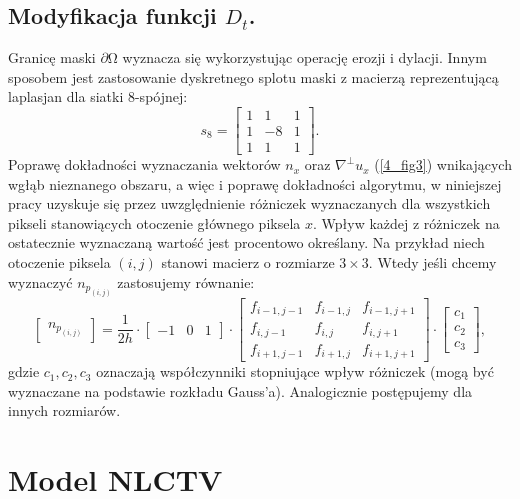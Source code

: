 \documentclass[a4paper,12pt,twoside,openany]{report}
\begin{document}
\subsection{Modyfikacja funkcji $D_t$.}
\label{ssec:modDtForCrim}
Granicę maski $\partial \mathrm{\Omega }$ wyznacza się wykorzystując operację erozji i dylacji. Innym sposobem jest zastosowanie dyskretnego splotu maski z macierzą reprezentującą laplasjan dla siatki 8-spójnej: 
\begin{equation}
s_8 = 
\left[ \begin{array}{ccc}
1 & 1 & 1 \\ 
1 & -8 & 1 \\ 
1 & 1 & 1 \end{array}
\right]
\label{LAPLASJAN}
.
\end{equation}
Poprawę dokładności wyznaczania wektorów $n_x$ oraz $\nabla^\bot u_x$ (\autoref{4_fig3}) wnikających wgłąb nieznanego obszaru, a więc i poprawę dokładności algorytmu, w niniejszej pracy uzyskuje się przez uwzględnienie różniczek wyznaczanych dla wszystkich pikseli stanowiących otoczenie głównego piksela $x$. Wpływ każdej z różniczek na ostatecznie wyznaczaną wartość jest procentowo określany.
Na przykład niech otoczenie piksela $(i, j)$ stanowi macierz o rozmiarze $3 \times 3$. Wtedy jeśli chcemy wyznaczyć $n_{p_{(i,j)}}$ zastosujemy równanie:
\begin{equation}
\begin{bmatrix}
n_{p_{(i,j)}}
\end{bmatrix}
=\frac{1}{2h}
\cdot
\begin{bmatrix}
-1 & 0 & 1
\end{bmatrix}
\cdot
\begin{bmatrix}
f_{i-1, j-1} & f_{i-1, j} & f_{i-1, j+1}\\ 
f_{i,   j-1} & f_{i,   j} & f_{i,   j+1}\\
f_{i+1, j-1} & f_{i+1, j} & f_{i+1, j+1}
\end{bmatrix}
\cdot
\begin{bmatrix}
c_1\\ 
c_2\\
c_3
\end{bmatrix},
\end{equation}
gdzie $c_1, c_2, c_3$ oznaczają współczynniki stopniujące wpływ różniczek (mogą być wyznaczane na podstawie rozkładu Gauss'a). Analogicznie postępujemy dla innych rozmiarów.
\section{Model NLCTV}
\label{sec:smodNLCTV}
\end{document}
